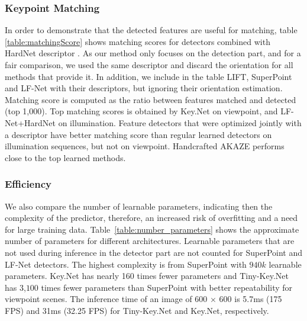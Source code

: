 \subsubsection{Keypoint Matching}
In order to demonstrate that the detected features are useful for matching, table \ref{table:matchingScore} shows matching scores for detectors combined with HardNet  descriptor \cite{Mishchuk_Mishkin_NIPS17}. As our method only focuses on the detection part, and for a fair comparison, we used the same descriptor and discard the orientation for all methods that provide it. In addition, we include in the table  LIFT\cite{LIFT}, SuperPoint\cite{detone2017superpoint} and LF-Net\cite{OnoSerra18} with their descriptors, but ignoring their orientation estimation. Matching score is computed as the ratio between features matched and detected (top 1,000). Top matching scores is obtained by Key.Net on viewpoint, and LF-Net+HardNet on illumination. Feature detectors that were optimized jointly with a descriptor \cite{LIFT, detone2017superpoint, OnoSerra18} have better matching score than regular learned detectors on illumination sequences, but not on viewpoint. Handcrafted AKAZE performs close to the top learned methods.\par


\subsubsection{Efficiency}
We also compare the number of learnable parameters, indicating then the complexity of the predictor, therefore, an increased risk of overfitting and a need for large training data. Table~\ref{table:number_parameters} shows the approximate number of parameters for different architectures. 
Learnable parameters that are not used during inference in the detector part are not counted for SuperPoint and LF-Net detectors.
The highest complexity is from SuperPoint with $940k$ learnable parameters. Key.Net has nearly 160 times fewer parameters and Tiny-Key.Net has $3$,$100$ times fewer parameters than SuperPoint with better repeatability for viewpoint scenes.
The inference time of an image of 600 $\times$ 600 is 5.7ms (175 FPS) and 31ms (32.25 FPS) for Tiny-Key.Net and Key.Net, respectively. 


